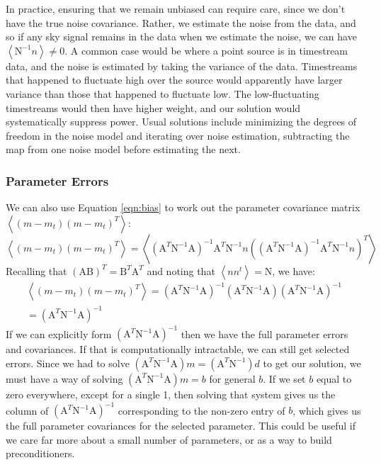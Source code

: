 \documentclass[12]{article}
\begin{document}
In practice, ensuring that we remain unbiased can require care, since
we don't have the true noise covariance.  Rather, we estimate the
noise from the data, and so if any sky signal remains in the data when
we estimate the noise, we can have $\left <\mathrm{N}^{-1} n \right >
\neq 0$.  A common case would be where a point source is in timestream
data, and the noise is estimated by taking the variance of the data.
Timestreams that happened to fluctuate high over the source would
apparently have larger variance than those that happened to fluctuate
low.  The low-fluctuating timestreams would then have higher weight,
and our solution would systematically suppress power.  Usual solutions
include minimizing the degrees of freedom in the noise model and
iterating over noise estimation, subtracting the map from one noise
model before estimating the next.

\subsubsection{Parameter Errors}
We can also use Equation \ref{eqn:bias} to work out the parameter
covariance matrix $\left < (m-m_t) (m-m_t)^T \right >$:
\begin{equation}
\left < (m-m_t) (m-m_t)^T \right >=
\left <\left (\mathrm{A}^T
\mathrm{N}^{-1} \mathrm{A} \right )^{-1} \mathrm{A}^T\mathrm{N}^{-1} n
\left ( \left (\mathrm{A}^T
\mathrm{N}^{-1} \mathrm{A} \right )^{-1} \mathrm{A}^T\mathrm{N}^{-1}
n\right )^T\right >
\end{equation}
Recalling that $(\mathrm{AB})^T=\mathrm{B}^T\mathrm{A}^T$ and noting
that $\left <n n^t \right > = \mathrm{N}$, we have:
\begin{eqnarray}
\left < (m-m_t) (m-m_t)^T \right > =
\left (\mathrm{A}^T \mathrm{N}^{-1} \mathrm{A} \right )^{-1}
\left (\mathrm{A}^T \mathrm{N}^{-1} \mathrm{A} \right )
\left (\mathrm{A}^T \mathrm{N}^{-1} \mathrm{A} \right )^{-1}\\
=\left (\mathrm{A}^T \mathrm{N}^{-1} \mathrm{A} \right )^{-1}
\end{eqnarray}
If we can explicitly form $\left (\mathrm{A}^T \mathrm{N}^{-1}
\mathrm{A} \right )^{-1}$ then we have the full parameter errors and
covariances.  If that is computationally intractable, we can still get
selected errors.  Since we had to solve 
$\left (\mathrm{A}^T \mathrm{N}^{-1} \mathrm{A} \right )m=\left
(\mathrm{A}^T \mathrm{N}^{-1} \right )d$ 
to get our solution, we must have a way of solving
$\left (\mathrm{A}^T \mathrm{N}^{-1} \mathrm{A} \right )m=b$ for
general $b$.  If we set $b$ equal to zero everywhere, except for a
single 1, then solving that system gives us the column of $\left
(\mathrm{A}^T \mathrm{N}^{-1} \mathrm{A} \right )^{-1}$ corresponding
to the non-zero entry of $b$, which gives us the full parameter
covariances for the selected parameter.  This could be useful if we
care far more about a small number of parameters, or as a way to build
preconditioners.  
\end{document}
